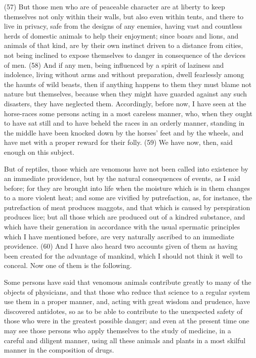 (57) But those men who are of peaceable character are at liberty to keep themselves not only
within their walls, but also even within tents, and there to live in privacy, safe from the designs of
any enemies, having vast and countless herds of domestic animals to help their enjoyment; since
boars and lions, and animals of that kind, are by their own instinct driven to a distance from cities,
not being inclined to expose themselves to danger in consequence of the devices of men. (58) And
if any men, being influenced by a spirit of laziness and indolence, living without arms and without
preparation, dwell fearlessly among the haunts of wild beasts, then if anything happens to them
they must blame not nature but themselves, because when they might have guarded against any
such disasters, they have neglected them. Accordingly, before now, I have seen at the
horse-races some persons acting in a most careless manner, who, when they ought to have sat
still and to have beheld the races in an orderly manner, standing in the middle have been knocked
down by the horses' feet and by the wheels, and have met with a proper reward for their folly. (59)
We have now, then, said enough on this subject.

But of reptiles, those which are venomous have not been called into existence by an immediate
providence, but by the natural consequences of events, as I said before; for they are brought into
life when the moisture which is in them changes to a more violent heat; and some are vivified by
putrefaction, as, for instance, the putrefaction of meat produces maggots, and that which is
caused by perspiration produces lice; but all those which are produced out of a kindred substance,
and which have their generation in accordance with the usual spermatic principles which I have
mentioned before, are very naturally ascribed to an immediate providence. (60) And I have also
heard two accounts given of them as having been created for the advantage of mankind, which I
should not think it well to conceal. Now one of them is the following.

Some persons have said that venomous animals contribute greatly to many of the objects of
physicians, and that those who reduce that science to a regular system use them in a proper
manner, and, acting with great wisdom and prudence, have discovered antidotes, so as to be able
to contribute to the unexpected safety of those who were in the greatest possible danger; and even
at the present time one may see those persons who apply themselves to the study of medicine, in
a careful and diligent manner, using all these animals and plants in a most skilful manner in the
composition of drugs.

